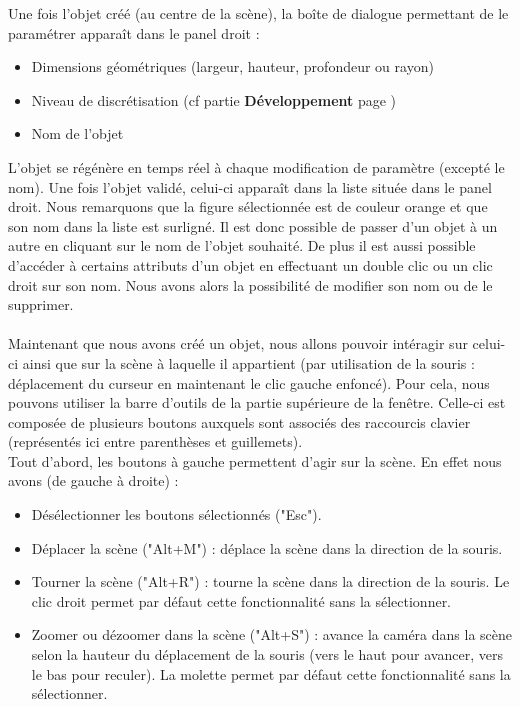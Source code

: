 \documentclass[a4paper]{memoir}
\begin{document}
			Une fois l'objet créé (au centre de la scène), la boîte de dialogue permettant de le paramétrer apparaît dans le panel droit :
			\begin{itemize}
				\item Dimensions géométriques (largeur, hauteur, profondeur ou rayon)
				\item Niveau de discrétisation (cf partie \textbf{Développement} page \pageref{mesh-dev})
				\item Nom de l'objet
			\end{itemize}
			L'objet se régénère en temps réel à chaque modification de paramètre (excepté le nom). Une fois l'objet validé, celui-ci apparaît dans la liste 
			située dans le panel droit. Nous remarquons que la figure sélectionnée est de couleur orange et que son nom dans la liste est surligné. Il est 
			donc possible de passer d'un objet à un autre en cliquant sur le nom de l'objet souhaité. De plus il est aussi possible d'accéder à certains 
			attributs d'un objet en effectuant un double clic ou un clic droit sur son nom. Nous avons alors la possibilité de modifier son nom ou de le 
			supprimer.\\\\ 
			Maintenant que nous avons créé un objet, nous allons pouvoir intéragir sur celui-ci ainsi que sur la scène à laquelle il appartient (par 
			utilisation de la souris : déplacement du curseur en maintenant le clic gauche enfoncé). Pour cela, nous pouvons utiliser la barre d'outils de 
			la partie supérieure de la fenêtre. Celle-ci est composée de plusieurs boutons auxquels sont associés des raccourcis clavier (représentés ici 
			entre parenthèses et guillemets).\\
			Tout d'abord, les boutons à gauche permettent d'agir sur la  scène. En effet nous avons (de gauche à droite) : 
			\begin{itemize}
				\item Désélectionner les boutons sélectionnés ("Esc").
				\item Déplacer la scène ("Alt+M") : déplace la scène dans la direction de la souris.
				\item Tourner la scène ("Alt+R") : tourne la scène dans la direction de la souris. Le clic droit permet par défaut cette fonctionnalité sans 
				la sélectionner.
				\item Zoomer ou dézoomer dans la scène ("Alt+S") : avance la caméra dans la scène selon la hauteur du déplacement de la souris (vers le haut 
				pour avancer, vers le bas pour reculer). La molette permet par défaut cette fonctionnalité sans la sélectionner.
			\end{itemize}
\end{document}
